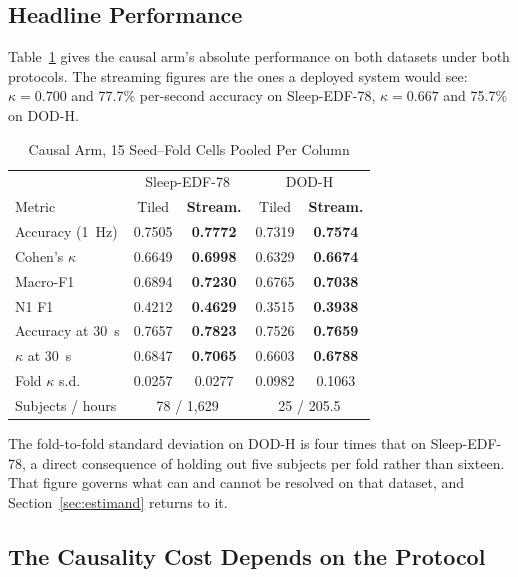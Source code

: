 \documentclass[conference]{IEEEtran}
\begin{document}
\subsection{Headline Performance}

Table~\ref{tab:headline} gives the causal arm's absolute performance on both datasets under both
protocols. The streaming figures are the ones a deployed system would see: $\kappa = 0.700$ and
77.7\% per-second accuracy on Sleep-EDF-78, $\kappa = 0.667$ and 75.7\% on DOD-H.

\begin{table}[t]
\caption{Causal Arm, 15 Seed--Fold Cells Pooled Per Column}
\label{tab:headline}
\centering
\footnotesize
\setlength{\tabcolsep}{4pt}
\begin{tabular}{lcc|cc}
\toprule
 & \multicolumn{2}{c|}{Sleep-EDF-78} & \multicolumn{2}{c}{DOD-H} \\
Metric & Tiled & \textbf{Stream.} & Tiled & \textbf{Stream.} \\
\midrule
Accuracy (1~Hz)   & 0.7505 & \textbf{0.7772} & 0.7319 & \textbf{0.7574} \\
Cohen's $\kappa$  & 0.6649 & \textbf{0.6998} & 0.6329 & \textbf{0.6674} \\
Macro-F1          & 0.6894 & \textbf{0.7230} & 0.6765 & \textbf{0.7038} \\
N1 F1             & 0.4212 & \textbf{0.4629} & 0.3515 & \textbf{0.3938} \\
Accuracy at 30~s  & 0.7657 & \textbf{0.7823} & 0.7526 & \textbf{0.7659} \\
$\kappa$ at 30~s  & 0.6847 & \textbf{0.7065} & 0.6603 & \textbf{0.6788} \\
Fold $\kappa$ s.d.& 0.0257 & 0.0277 & 0.0982 & 0.1063 \\
\midrule
Subjects / hours & \multicolumn{2}{c|}{78 / 1{,}629} & \multicolumn{2}{c}{25 / 205.5} \\
\bottomrule
\end{tabular}
\end{table}

The fold-to-fold standard deviation on DOD-H is four times that on Sleep-EDF-78, a direct
consequence of holding out five subjects per fold rather than sixteen. That figure governs what can
and cannot be resolved on that dataset, and Section~\ref{sec:estimand} returns to it.

\subsection{The Causality Cost Depends on the Protocol}
\end{document}
